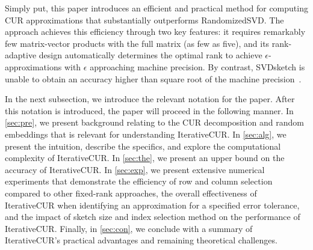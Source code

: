 Simply put, this paper introduces an efficient and practical method for computing CUR approximations that substantially outperforms RandomizedSVD. The approach achieves this efficiency through two key features: it requires remarkably few matrix-vector products with the full matrix (as few as five), and its rank-adaptive design automatically determines the optimal rank to achieve  $\epsilon$-approximations with  $\epsilon$ approaching machine precision. By contrast, SVDsketch is unable to obtain an accuracy higher than square root of the machine precision~\cite{yu2018efficient}.


In the next subsection, we introduce the relevant notation for the paper.  After this notation is introduced, the paper will proceed in the following manner. 
In \cref{sec:pre}, we present background relating to the CUR decomposition and random embeddings that is relevant for understanding IterativeCUR.
In \cref{sec:alg}, we present the intuition, describe the specifics, and explore the computational complexity of IterativeCUR. 
In \cref{sec:the}, we present an upper bound on the accuracy of IterativeCUR.
In \cref{sec:exp}, we present extensive numerical experiments that demonstrate the efficiency of row and column selection compared to other fixed-rank approaches, the overall effectiveness of IterativeCUR when identifying an approximation for a specified error tolerance, and the impact of sketch size and index selection method on the performance of IterativeCUR. Finally, in \cref{sec:con}, we conclude with a summary of IterativeCUR's practical advantages and remaining theoretical challenges.
